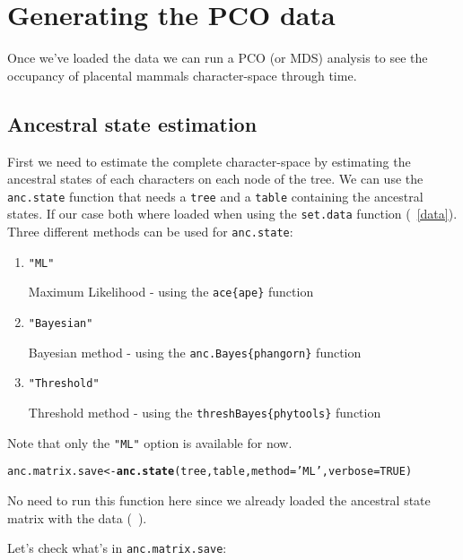\documentclass[a4paper,11pt]{article}\usepackage[]{graphicx}\usepackage[]{color}
\makeatletter
\newcommand{\hlnum}[1]{\textcolor[rgb]{0.686,0.059,0.569}{#1}}%
\newcommand{\hlstr}[1]{\textcolor[rgb]{0.192,0.494,0.8}{#1}}%
\newcommand{\hlstd}[1]{\textcolor[rgb]{0.345,0.345,0.345}{#1}}%
\newcommand{\hlkwb}[1]{\textcolor[rgb]{0.69,0.353,0.396}{#1}}%
\newcommand{\hlkwc}[1]{\textcolor[rgb]{0.333,0.667,0.333}{#1}}%
\newcommand{\hlkwd}[1]{\textcolor[rgb]{0.737,0.353,0.396}{\textbf{#1}}}%
\newenvironment{kframe}{%
 \def\at@end@of@kframe{}%
 \ifinner\ifhmode%
  \def\at@end@of@kframe{\end{minipage}}%
  \begin{minipage}{\columnwidth}%
 \fi\fi%
 \def\FrameCommand##1{\hskip\@totalleftmargin \hskip-\fboxsep
 \colorbox{shadecolor}{##1}\hskip-\fboxsep
     \hskip-\linewidth \hskip-\@totalleftmargin \hskip\columnwidth}%
 \MakeFramed {\advance\hsize-\width
   \@totalleftmargin\z@ \linewidth\hsize
   \@setminipage}}%
 {\par\unskip\endMakeFramed%
 \at@end@of@kframe}
\newenvironment{knitrout}{}{} %
\makeatother
\begin{document}
\section{Generating the PCO data}
Once we've loaded the data we can run a PCO (or MDS) analysis to see the occupancy of placental mammals character-space through time.

\subsection{Ancestral state estimation} \label{ACE}
First we need to estimate the complete character-space by estimating the ancestral states of each characters on each node of the tree.
We can use the \texttt{anc.state} function that needs a \texttt{tree} and a \texttt{table} containing the ancestral states.
If our case both where loaded when using the \texttt{set.data} function (~\ref{data}).
Three different methods can be used for \texttt{anc.state}:
\begin{enumerate}
\item{\texttt{"ML"}}

Maximum Likelihood - using the \texttt{ace\{ape\}} function
\item{\texttt{"Bayesian"}}

Bayesian method - using the \texttt{anc.Bayes\{phangorn\}} function

\item{\texttt{"Threshold"}}

Threshold method - using the \texttt{threshBayes\{phytools\}} function
\end{enumerate}
Note that only the \texttt{"ML"} option is available for now.

\begin{knitrout}
\color{fgcolor}\begin{kframe}
\begin{alltt}
\hlstd{anc.matrix.save}\hlkwb{<-}\hlkwd{anc.state}\hlstd{(tree, table,} \hlkwc{method}\hlstd{=}\hlstr{'ML'}\hlstd{,} \hlkwc{verbose}\hlstd{=}\hlnum{TRUE}\hlstd{)}
\end{alltt}
\end{kframe}
\end{knitrout}

No need to run this function here since we already loaded the ancestral state matrix with the data (~\label{data}).

Let's check what's in \texttt{anc.matrix.save}:
\end{document}
